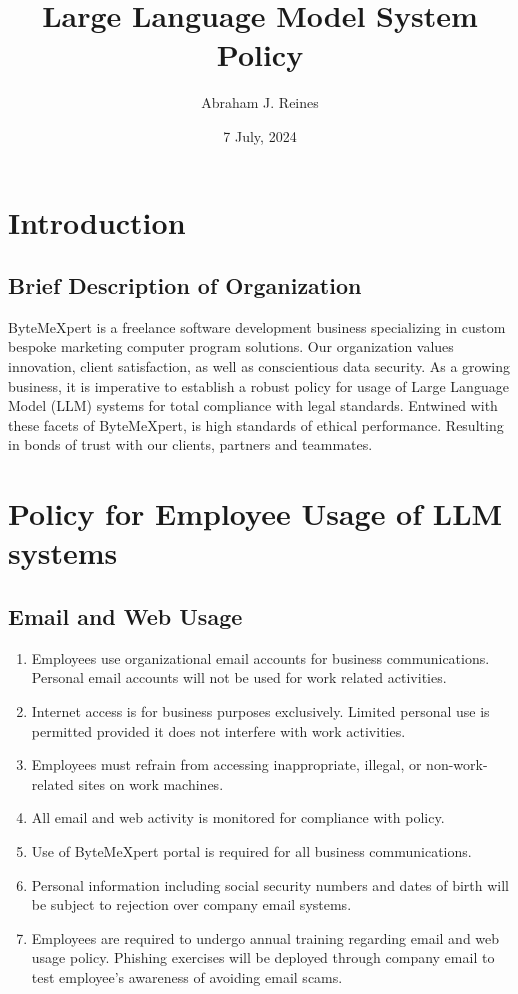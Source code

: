 \documentclass[12pt]{article}
\title{Large Language Model System Policy}
\author{Abraham J. Reines}
\date{7 July, 2024}
\begin{document}
 
\maketitle
 
\tableofcontents
 
\newpage
 
\section{Introduction}
 
\subsection{Brief Description of Organization}
 
ByteMeXpert is a freelance software development business specializing in custom bespoke marketing computer program solutions. Our organization values innovation, client satisfaction, as well as conscientious data security. As a growing business, it is imperative to establish a robust policy for usage of Large Language Model (LLM) systems for total compliance with legal standards. Entwined with these facets of ByteMeXpert, is high standards of ethical performance.  Resulting in bonds of trust with our clients, partners and teammates.
 
\section{Policy for Employee Usage of LLM systems}
 
\subsection{Email and Web Usage}
 
\begin{enumerate}
    \item Employees use organizational email accounts for business communications. Personal email accounts will not be used for work related activities.
    \item Internet access is for business purposes exclusively. Limited personal use is permitted provided it does not interfere with work activities.
    \item Employees must refrain from accessing inappropriate, illegal, or non-work-related sites on work machines.
    \item All email and web activity is monitored for compliance with policy.
    \item Use of ByteMeXpert portal is required for all business communications.
    \item Personal information including social security numbers and dates of birth will be subject to rejection over company email systems.
    \item Employees are required to undergo annual training regarding email and web usage policy.
                Phishing exercises will be deployed through company email to test employee’s awareness of avoiding email scams.
               
\end{enumerate}
 
\end{document}
